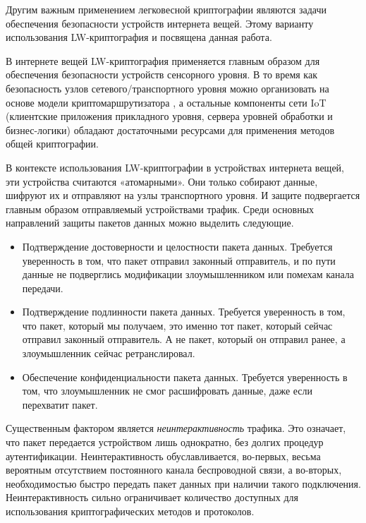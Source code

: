 Другим важным применением легковесной криптографии являются задачи обеспечения безопасности устройств интернета вещей. Этому варианту использования LW-криптография и посвящена данная работа.

В интернете вещей LW-криптография применяется главным образом для обеспечения безопасности устройств сенсорного уровня. В то время как безопасность узлов сетевого/транспортного уровня можно организовать на основе модели криптомаршрутизатора \cite{src23}, а остальные компоненты сети IoT (клиентские приложения прикладного уровня, сервера уровней обработки и бизнес-логики) обладают достаточными ресурсами для применения методов общей криптографии.

В контексте использования LW-криптографии в устройствах интернета вещей, эти устройства считаются «атомарными». Они только собирают данные, шифруют их и отправляют на узлы транспортного уровня. И защите подвергается главным образом отправляемый устройствами трафик. Среди основных направлений защиты пакетов данных можно выделить следующие.
\begin{itemize}
	\item Подтверждение достоверности и целостности пакета данных. Требуется уверенность в том, что пакет отправил законный отправитель, и по пути данные не подверглись модификации злоумышленником или помехам канала передачи.
	\item Подтверждение подлинности пакета данных. Требуется уверенность в том, что пакет, который мы получаем, это именно тот пакет, который сейчас отправил законный отправитель. А не пакет, который он отправил ранее, а злоумышленник сейчас ретранслировал.
	\item Обеспечение конфиденциальности пакета данных. Требуется уверенность в том, что злоумышленник не смог расшифровать данные, даже если перехватит пакет.
\end{itemize}

Существенным фактором является \textit{неинтерактивность} трафика. Это означает, что пакет передается устройством лишь однократно, без долгих процедур аутентификации. Неинтерактивность обуславливается, во-первых, весьма вероятным отсутствием постоянного канала беспроводной связи, а во-вторых, необходимостью быстро передать пакет данных при наличии такого подключения. Неинтерактивность сильно ограничивает количество доступных для использования криптографических методов и протоколов.

